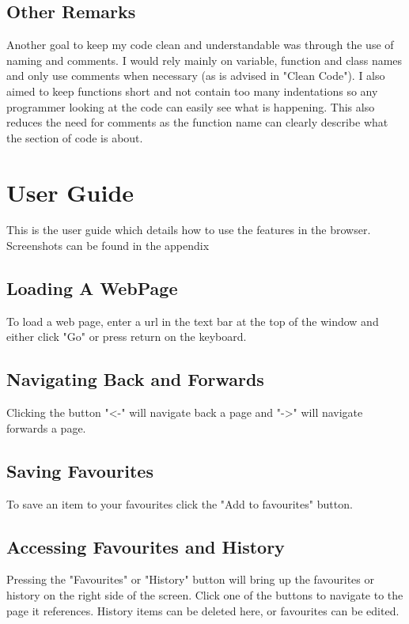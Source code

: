 \documentclass[11pt]{report}
\begin{document}
\section{Other Remarks}

Another goal to keep my code clean and understandable was through the use of naming and comments.  I would rely mainly on variable, function and class names and only use comments when necessary (as is advised in "Clean Code").  I also aimed to keep functions short and not contain too many indentations so any programmer looking at the code can easily see what is happening.  This also reduces the need for comments as the function name can clearly describe what the section of code is about.

\chapter{User Guide}

This is the user guide which details how to use the features in the browser.  Screenshots can be found in the appendix

\section{Loading A WebPage}

To load a web page, enter a url in the text bar at the top of the window and either click "Go" or press return on the keyboard.

\section{Navigating Back and Forwards}

Clicking the button "\textless-" will navigate back a page and "-\textgreater" will navigate forwards a page.

\section{Saving Favourites}

To save an item to your favourites click the "Add to favourites" button.

\section{Accessing Favourites and History}

Pressing the "Favourites" or "History" button will bring up the favourites or history on the right side of the screen.  Click one of the buttons to navigate to the page it references.  History items can be deleted here, or favourites can be edited.
\end{document}
